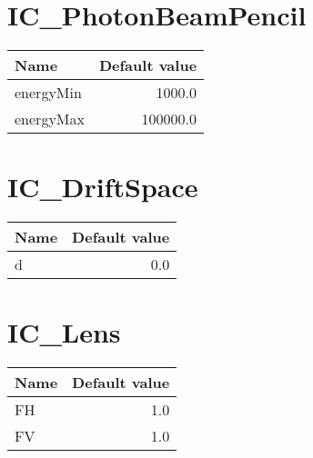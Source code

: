 \documentclass{article}
\begin{document}
\section{IC\_PhotonBeamPencil}
\begin{tabular}{lr}
Name & Default value \\
\hline
energyMin & 1000.0 \\
energyMax & 100000.0 \\
   
\end{tabular}



\section{IC\_DriftSpace}
\begin{tabular}{lr}
Name & Default value \\
\hline
d & 0.0 \\
   
\end{tabular}



\section{IC\_Lens}
\begin{tabular}{lr}
Name & Default value \\
\hline
FH & 1.0 \\
FV & 1.0 \\
   
\end{tabular}



\end{document}
